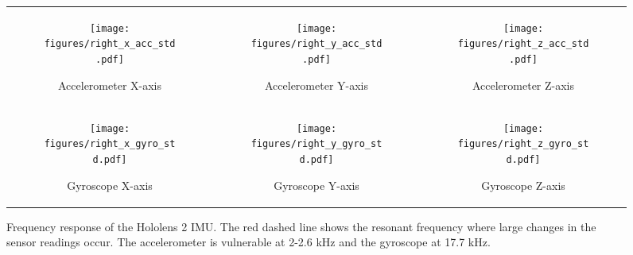 \begin{figure*}[h]
    \centering
    \begin{tabular}{ccc}
        \begin{subfigure}[b]{0.3\textwidth}
            \centering
            \texttt{[image: figures/right\_x\_acc\_std.pdf]}
            \caption{Accelerometer X-axis}
            \label{subfig:right_std_1}
        \end{subfigure} &
        \begin{subfigure}[b]{0.3\textwidth}
            \centering
            \texttt{[image: figures/right\_y\_acc\_std.pdf]}
            \caption{Accelerometer Y-axis}
            \label{subfig:right_std_2}
        \end{subfigure} &
        \begin{subfigure}[b]{0.3\textwidth}
            \centering
            \texttt{[image: figures/right\_z\_acc\_std.pdf]}
            \caption{Accelerometer Z-axis}
            \label{subfig:right_std_3}
        \end{subfigure} \\
        
        \begin{subfigure}[b]{0.3\textwidth}
            \centering
            \texttt{[image: figures/right\_x\_gyro\_std.pdf]}
            \caption{Gyroscope X-axis}
            \label{subfig:right_std_4}
        \end{subfigure} &
        \begin{subfigure}[b]{0.3\textwidth}
            \centering
            \texttt{[image: figures/right\_y\_gyro\_std.pdf]}
            \caption{Gyroscope Y-axis}
            \label{subfig:right_std_5}
        \end{subfigure} &
        \begin{subfigure}[b]{0.3\textwidth}
            \centering
            \texttt{[image: figures/right\_z\_gyro\_std.pdf]}
            \caption{Gyroscope Z-axis}
            \label{subfig:right_std_6}
        \end{subfigure}
    \end{tabular}
    \caption{Frequency response of the Hololens 2 IMU. The red dashed line shows the resonant frequency where large changes in the sensor readings occur. The accelerometer is vulnerable at 2-2.6 kHz and the gyroscope at 17.7 kHz.
    }
    \label{fig:right_std}
\end{figure*}


